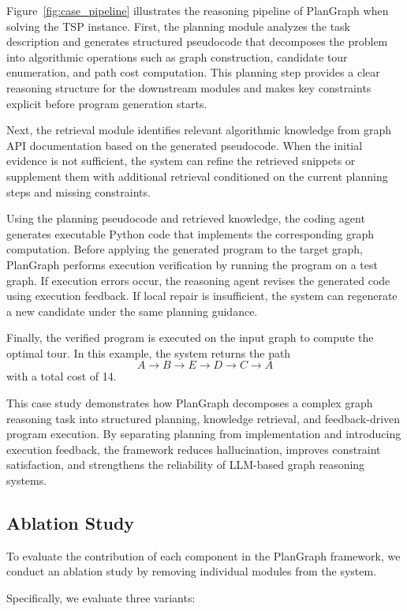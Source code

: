 \documentclass[sigconf,review,anonymous]{acmart}
\begin{document}
Figure~\ref{fig:case_pipeline} illustrates the reasoning
pipeline of PlanGraph when solving the TSP instance. First,
the planning module analyzes the task description and
generates structured pseudocode that decomposes the problem
into algorithmic operations such as graph construction,
candidate tour enumeration, and path cost computation.
This planning step provides a clear reasoning structure
for the downstream modules and makes key constraints explicit
before program generation starts.

Next, the retrieval module identifies relevant algorithmic
knowledge from graph API documentation based on the
generated pseudocode. When the initial evidence is not
sufficient, the system can refine the retrieved snippets
or supplement them with additional retrieval conditioned on
the current planning steps and missing constraints.

Using the planning pseudocode and retrieved knowledge,
the coding agent generates executable Python code that
implements the corresponding graph computation. Before
applying the generated program to the target graph,
PlanGraph performs execution verification by running the
program on a test graph. If execution errors occur, the
reasoning agent revises the generated code using execution
feedback. If local repair is insufficient, the system can
regenerate a new candidate under the same planning guidance.

Finally, the verified program is executed on the input
graph to compute the optimal tour. In this example, the
system returns the path
\[
A \rightarrow B \rightarrow E \rightarrow D \rightarrow C \rightarrow A
\]
with a total cost of 14.

This case study demonstrates how PlanGraph decomposes a
complex graph reasoning task into structured planning,
knowledge retrieval, and feedback-driven program execution.
By separating planning from implementation and introducing
execution feedback, the framework reduces hallucination,
improves constraint satisfaction, and strengthens the
reliability of LLM-based graph reasoning systems.

\subsection{Ablation Study}

To evaluate the contribution of each component in the
PlanGraph framework, we conduct an ablation study by
removing individual modules from the system.

Specifically, we evaluate three variants:
\end{document}
